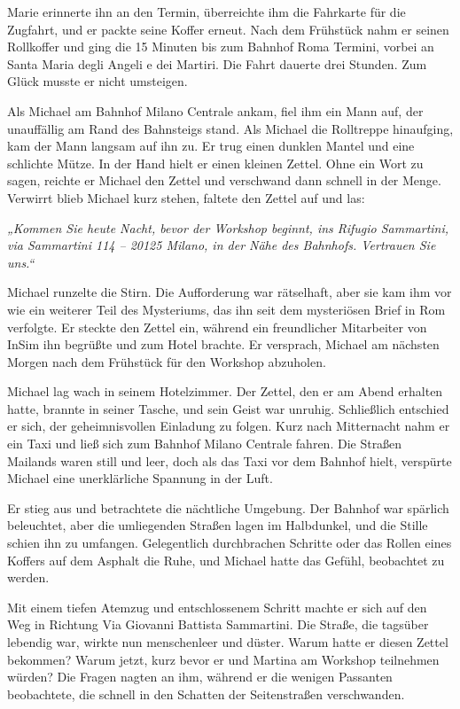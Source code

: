\documentclass[
]{article}
\begin{document}
Marie erinnerte ihn an den Termin, überreichte ihm die Fahrkarte für die
Zugfahrt, und er packte seine Koffer erneut. Nach dem Frühstück nahm er
seinen Rollkoffer und ging die 15 Minuten bis zum Bahnhof Roma Termini,
vorbei an Santa Maria degli Angeli e dei Martiri. Die Fahrt dauerte drei
Stunden. Zum Glück musste er nicht umsteigen.

Als Michael am Bahnhof Milano Centrale ankam, fiel ihm ein Mann auf, der
unauffällig am Rand des Bahnsteigs stand. Als Michael die Rolltreppe
hinaufging, kam der Mann langsam auf ihn zu. Er trug einen dunklen
Mantel und eine schlichte Mütze. In der Hand hielt er einen kleinen
Zettel. Ohne ein Wort zu sagen, reichte er Michael den Zettel und
verschwand dann schnell in der Menge. Verwirrt blieb Michael kurz
stehen, faltete den Zettel auf und las:

\emph{„Kommen Sie heute Nacht, bevor der Workshop beginnt, ins Rifugio
Sammartini, via Sammartini 114 -- 20125 Milano, in der Nähe des
Bahnhofs. Vertrauen Sie uns.``}

Michael runzelte die Stirn. Die Aufforderung war rätselhaft, aber sie
kam ihm vor wie ein weiterer Teil des Mysteriums, das ihn seit dem
mysteriösen Brief in Rom verfolgte. Er steckte den Zettel ein, während
ein freundlicher Mitarbeiter von InSim ihn begrüßte und zum Hotel
brachte. Er versprach, Michael am nächsten Morgen nach dem Frühstück für
den Workshop abzuholen.

Michael lag wach in seinem Hotelzimmer. Der Zettel, den er am Abend
erhalten hatte, brannte in seiner Tasche, und sein Geist war unruhig.
Schließlich entschied er sich, der geheimnisvollen Einladung zu folgen.
Kurz nach Mitternacht nahm er ein Taxi und ließ sich zum Bahnhof Milano
Centrale fahren. Die Straßen Mailands waren still und leer, doch als das
Taxi vor dem Bahnhof hielt, verspürte Michael eine unerklärliche
Spannung in der Luft.

Er stieg aus und betrachtete die nächtliche Umgebung. Der Bahnhof war
spärlich beleuchtet, aber die umliegenden Straßen lagen im Halbdunkel,
und die Stille schien ihn zu umfangen. Gelegentlich durchbrachen
Schritte oder das Rollen eines Koffers auf dem Asphalt die Ruhe, und
Michael hatte das Gefühl, beobachtet zu werden.

Mit einem tiefen Atemzug und entschlossenem Schritt machte er sich auf
den Weg in Richtung Via Giovanni Battista Sammartini. Die Straße, die
tagsüber lebendig war, wirkte nun menschenleer und düster. Warum hatte
er diesen Zettel bekommen? Warum jetzt, kurz bevor er und Martina am
Workshop teilnehmen würden? Die Fragen nagten an ihm, während er die
wenigen Passanten beobachtete, die schnell in den Schatten der
Seitenstraßen verschwanden.
\end{document}
